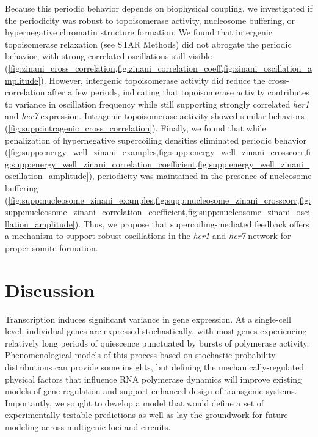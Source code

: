 \documentclass[11pt]{article} %
\begin{document}
Because this periodic behavior depends on biophysical coupling, we investigated if the periodicity was robust to topoisomerase activity, nucleosome buffering, or hypernegative chromatin structure formation. We found that intergenic topoisomerase relaxation (see STAR Methods) did not abrogate the periodic behavior, with strong correlated oscillations still visible (\cref{fig:zinani_cross_correlation,fig:zinani_correlation_coeff,fig:zinani_oscillation_amplitude}). However, intergenic topoisomerase activity did reduce the cross-correlation after a few periods, indicating that topoisomerase activity contributes to variance in oscillation frequency while still supporting strongly correlated \emph{her1} and \emph{her7} expression. Intragenic topoisomerase activity showed similar behaviors (\cref{fig:supp:intragenic_cross_correlation}). Finally, we found that while penalization of hypernegative supercoiling densities eliminated periodic behavior (\cref{fig:supp:energy_well_zinani_examples,fig:supp:energy_well_zinani_crosscorr,fig:supp:energy_well_zinani_correlation_coefficient,fig:supp:energy_well_zinani_oscillation_amplitude}), periodicity was maintained in the presence of nucleosome buffering (\cref{fig:supp:nucleosome_zinani_examples,fig:supp:nucleosome_zinani_crosscorr,fig:supp:nucleosome_zinani_correlation_coefficient,fig:supp:nucleosome_zinani_oscillation_amplitude}).
Thus, we propose that supercoiling-mediated feedback offers a mechanism to support robust oscillations in the \textit{her1} and \textit{her7} network for proper somite formation. 


\FloatBarrier
\section{Discussion}
Transcription induces significant variance in gene expression. At a single-cell level, individual genes are expressed stochastically, with most genes experiencing relatively long periods of quiescence punctuated by bursts of polymerase activity. Phenomenological models of this process based on stochastic probability distributions can provide some insights, but defining the mechanically-regulated physical factors that influence RNA polymerase dynamics  will improve existing models of gene regulation and support enhanced design of transgenic systems.  Importantly, we sought to develop a model that would define a set of experimentally-testable predictions as well as lay the groundwork for future modeling across multigenic loci and circuits. 
 
\end{document}
